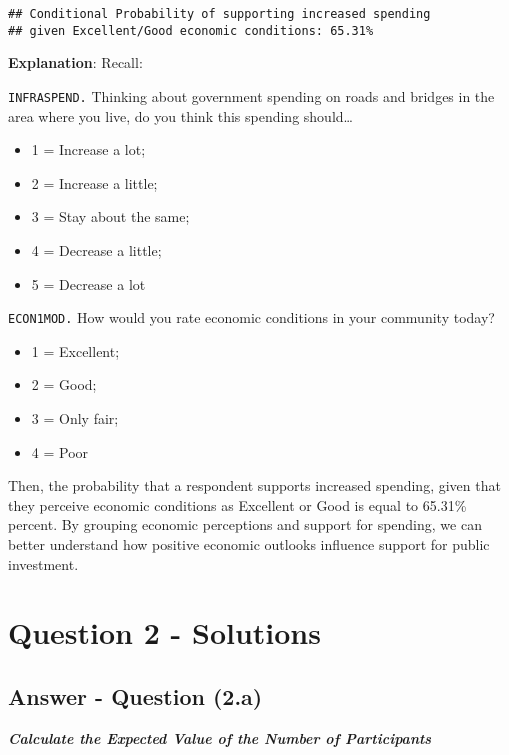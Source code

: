 \documentclass[
  11pt,
]{article}
\providecommand{\tightlist}{%
  \setlength{\itemsep}{0pt}\setlength{\parskip}{0pt}}
\begin{document}
\begin{verbatim}
## Conditional Probability of supporting increased spending 
## given Excellent/Good economic conditions: 65.31%
\end{verbatim}

\textbf{Explanation}: Recall:

\texttt{INFRASPEND.} Thinking about government spending on roads and
bridges in the area where you live, do you think this spending
should\ldots{}

\begin{itemize}
\tightlist
\item
  1 = Increase a lot;
\item
  2 = Increase a little;
\item
  3 = Stay about the same;
\item
  4 = Decrease a little;
\item
  5 = Decrease a lot
\end{itemize}

\texttt{ECON1MOD.} How would you rate economic conditions in your
community today?

\begin{itemize}
\tightlist
\item
  1 = Excellent;
\item
  2 = Good;
\item
  3 = Only fair;
\item
  4 = Poor
\end{itemize}

Then, the probability that a respondent supports increased spending,
given that they perceive economic conditions as Excellent or Good is
equal to 65.31\% percent. By grouping economic perceptions and support
for spending, we can better understand how positive economic outlooks
influence support for public investment.

\section{Question 2 - Solutions}\label{question-2---solutions}

\subsection{Answer - Question (2.a)}\label{answer---question-2.a}

\textbf{\emph{Calculate the Expected Value of the Number of
Participants}}
\end{document}
